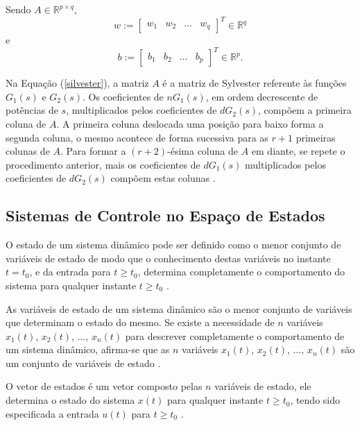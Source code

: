 \documentclass[journal,brazil,english]{IEEEtran}
\begin{document}
Sendo  $A \in \mathbb{R}^{p \times q}$,
\begin{equation}
w:=\begin{bmatrix}
w_1 &
w_2 &
\ldots &
w_q
\end{bmatrix}^T \in \mathbb{R}^q
\end{equation}
e
\begin{equation}
b:=\begin{bmatrix}
b_1 &
b_2 &
\ldots &
b_p
\end{bmatrix}^T \in \mathbb{R}^p.
\end{equation}

Na Equação (\ref{silvester}), a matriz $A$ é a matriz de Sylvester \cite{maitelli} referente às funções $G_1(s)$ e $G_2(s)$. Os coeficientes de $nG_1(s)$, em ordem decrescente de potências de $s$, multiplicados pelos coeficientes de $dG_2(s)$, compõem a primeira coluna de $A$. A primeira coluna deslocada uma posição para baixo forma a segunda coluna, o mesmo acontece de forma sucessiva para as $r+1$ primeiras colunas de $A$. Para formar a $(r + 2)$-ésima coluna de $A$ em diante, se repete o procedimento anterior, mais os coeficientes de $dG_1(s)$ multiplicados pelos coeficientes de $dG_2(s)$ compõem estas colunas \cite{maitelli}.

\subsection{Sistemas de Controle no Espaço de Estados}\label{espacoestados}

O estado de um sistema dinâmico pode ser definido como o menor conjunto de variáveis de estado de modo que o conhecimento destas variáveis no instante $t=t_0$, e da entrada para $t\geqslant t_0$, determina completamente o comportamento do sistema para qualquer instante $t \geqslant t_0$ \cite{ogata}.

As  variáveis  de  estado  de  um  sistema  dinâmico  são  o  menor  conjunto  de variáveis   que   determinam   o   estado   do   mesmo.  Se existe a necessidade de $n$ variáveis $x_1(t)$, $x_2(t)$, $\ldots$, $x_n(t)$ para  descrever  completamente  o  comportamento  de  um sistema  dinâmico, afirma-se que as $n$ variáveis $x_1(t)$, $x_2(t)$, $\ldots$, $x_n(t)$ são um conjunto de variáveis de estado \cite{ogata}.

O vetor de estados é um vetor composto pelas $n$ variáveis de estado, ele determina o estado do sistema $x(t)$ para qualquer instante $t \geqslant t_0$, tendo sido especificada a entrada $u(t)$ para $t \geqslant t_0$ \cite{ogata}.
\end{document}
